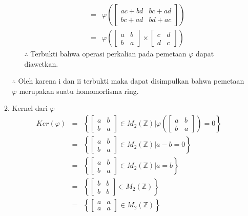 \documentclass[12pt,A4paper]{article}
\begin{document}
\begin{enumerate}
\begin{enumerate}
\begin{enumerate}
\begin{eqnarray*}
	&=& \varphi \left(\begin{bmatrix}
		ac + bd & bc+ad\\
		bc+ad & bd+ac
	\end{bmatrix}\right) \\
&=& \varphi \left(\begin{bmatrix}
	a & b\\
	b & a
\end{bmatrix} \times \begin{bmatrix}
	c & d\\
	d & c
\end{bmatrix}  \right)
\end{eqnarray*}
$\therefore$ Terbukti bahwa operasi perkalian pada pemetaan $\varphi$ dapat diawetkan.
	 \end{enumerate}
 $\therefore$ Oleh karena i dan ii terbukti maka dapat disimpulkan bahwa pemetaan $\varphi$ merupakan suatu homomorfisma ring.
 \newpage
 \item Kernel dari $\varphi$
 \begin{eqnarray*}
 	Ker(\varphi) &=& \left\lbrace \begin{bmatrix}
 		a & b\\
 		b & a
 	\end{bmatrix} \in M_2(\mathbb{Z}) | \varphi\left(\begin{bmatrix}
 	a & b\\
 	b & a
 \end{bmatrix}\right) = 0 \right\rbrace \\
&=& \left\lbrace \begin{bmatrix}
	a & b\\
	b & a
\end{bmatrix} \in M_2(\mathbb{Z}) | a - b = 0 \right\rbrace \\
&=& \left\lbrace \begin{bmatrix}
	a & b\\
	b & a
\end{bmatrix} \in M_2(\mathbb{Z}) | a = b \right\rbrace \\
&=&\left\lbrace \begin{bmatrix}
	b & b\\
	b & b
\end{bmatrix} \in M_2(\mathbb{Z})  \right\rbrace \\
&=&\left\lbrace \begin{bmatrix}
	a & a\\
	a & a
\end{bmatrix} \in M_2(\mathbb{Z})  \right\rbrace
 \end{eqnarray*}

\end{enumerate}
\end{enumerate}
\end{document}
